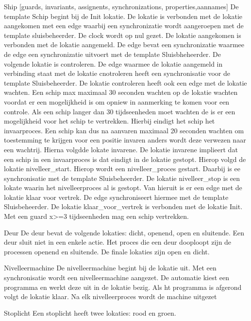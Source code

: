\begin{thebibliography}{99}
{{{{{{Ship [guards, invariants, assignents, synchronizations, properties,aannames]
De template Schip begint bij de Init lokatie. De lokatie is verbonden met de lokatie aangekomen met een edge waarbij een synchronizatie wordt aangeroepen met de template sluisbeheerder. De clock wordt op nul gezet. De lokatie aangekomen is verbonden met de lokatie aangemeld. De edge bevat een synchronizatie waarmee de edge een synchronizatie uitvoert met de template Sluisbheheerder.
De volgende lokatie is  controleren. De edge waarmee de lokatie aangemeld in verbinding staat met de lokatie cnotroleren heeft een synchronisatie voor de template Sluisbeheerder. De lokatie controleren heeft ook een edge met de lokatie wachten. Een schip max maximaal 30 seconden wachten op de lokatie wachten voordat er een mogelijkheid is om opniew in aanmerking te komen voor een controle. Als een schip langer dan 30 tijdseenheden moet wachten de is er een mogelijkheid voor het schip te vertrekken. Hierbij eindigt het schip het invaarproces. Een schip kan dus na aanvaren maximaal 20 seconden wachten om toestemming te krijgen voor een positie invaren anders wordt deze verwezen naar een wachtrij.
Hierna volgdde lokate invarene. De lokatie invarene implieert dat een schip in een invaarproces is dat eindigt in de lokatie gestopt.
Hierop volgd de lokatie nivelleer_start. Hierop wordt een nivelleer_proces gestart. Daarbij is ee synchronisatie met de template Sluisbeheerder.
De lokatie nivelleer_stop is een lokate waarin het nivelleerproces al is gestopt. Van hieruit is er een edge met de lokatie klaar voor vertrek. De edge synchroniseert hiermee met de template Sluisbeheerder.
De lokatie klaar_voor_vertrek is verbonden met de lokatie Init. Met een guard x>=3 tijdseenheden mag een schip vertrekken.


Deur
De deur bevat de volgende lokaties: dicht, openend, open en sluitende.
Een deur sluit niet in een enkele actie. Het proces die een deur dooploopt zijn de processen openend en sluitende. De finale lokaties zijn open en dicht.

Nivelleermachine
De nivelleermachine begint bij de lokatie uit. Met een synchronisatie wordt een nivelleermachine aangezet. De automatie kiest een programma en werkt deze uit in de lokatie bezig. Als ht programma is afgerond volgt de lokatie klaar. Na elk nivelleerproces wordt de machine uitgezet

Stoplicht
Een stoplicht heeft twee lokaties: rood en groen.




}}}}}}
\end{thebibliography}
